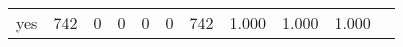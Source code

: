 \begin{longtable}{lp{1.10cm}p{1.10cm}p{1.10cm}p{1.10cm}p{1.10cm}p{1.10cm}p{1.10cm}p{1.10cm}p{1.10cm}p{1.10cm}}
yes       &                    742 &                                  0 &                                 0 &                                0 &                                 0 &                             742 &                          1.000 &                                 1.000 &                               1.000 \\
\end{longtable}
